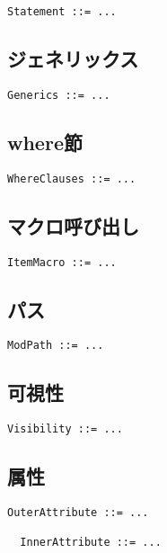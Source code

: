 \documentclass[dvipdfmx,uplatex,papersize,a4paper,10pt]{jsbook}
\theoremstyle{definition}
\begin{document}
\begin{lstlisting}[language=BNFLike, gobble=2]
  Statement ::= ...
\end{lstlisting}

\subsection{ジェネリックス}

\begin{lstlisting}[language=BNFLike, gobble=2]
  Generics ::= ...
\end{lstlisting}

\subsection{where節}

\begin{lstlisting}[language=BNFLike, gobble=2]
  WhereClauses ::= ...
\end{lstlisting}

\subsection{マクロ呼び出し}

\begin{lstlisting}[language=BNFLike, gobble=2]
  ItemMacro ::= ...
\end{lstlisting}

\subsection{パス}

\begin{lstlisting}[language=BNFLike, gobble=2]
  ModPath ::= ...
\end{lstlisting}

\subsection{可視性}

\begin{lstlisting}[language=BNFLike, gobble=2]
  Visibility ::= ...
\end{lstlisting}

\subsection{属性}

\begin{lstlisting}[language=BNFLike, gobble=2]
  OuterAttribute ::= ...

  InnerAttribute ::= ...
\end{lstlisting}
\end{document}
